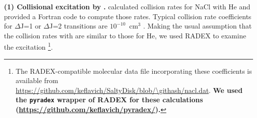 \documentclass[twocolumn]{aastex62}
\newcommand{\rlp}[1]{\textcolor{red!65!black}{\textbf{[RLP: #1]}}}
\newcommand{\ag}[1]{\textcolor{red!65!black}{\textbf{[AG: #1]}}}
\newcommand{\referee}[1]{\textbf{#1}}
\begin{document}
\par{\textbf{(1) Collisional excitation by \hh.}} 
%
%
\citet{Quintana-Lacaci2016a} calculated collision rates for NaCl with He and
provided a Fortran code to compute those rates.  Typical collision rate
coefficients for \hbox{$\Delta$J=1} or \hbox{$\Delta$J=2} transitions are
$10^{-10}$~cm$^3$ \pers.  Making the usual assumption that the collision rates
with \hh are similar to those for He, we used RADEX \citep{van-der-Tak2007a} to
examine the excitation \footnote{The RADEX-compatible molecular data file
incorporating these coefficients is available from
\url{https://github.com/keflavich/SaltyDisk/blob/\githash/nacl.dat}.
\referee{We used the \texttt{pyradex} wrapper of RADEX for these
calculations (\url{https://github.com/keflavich/pyradex/}).}
}.
\end{document}
